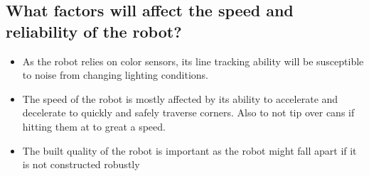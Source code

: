 \documentclass[../../main.tex]{subfiles}
\begin{document}
\subsection{What factors will affect the speed and reliability of the robot?}%
\label{sub:what_factors_will_affect_the_speed_and_reliability_of_the_robot_}

\begin{itemize}
	\item As the robot relies on color sensors, its line tracking ability will be susceptible to
		noise from changing lighting conditions.
	\item The speed of the robot is mostly affected by its ability to accelerate and decelerate to
		quickly and safely traverse corners. Also to not tip over cans if hitting them at to great a
		speed.
	\item The built quality of the robot is important as the robot might fall apart if it is not
		constructed robustly
\end{itemize}
\end{document}
